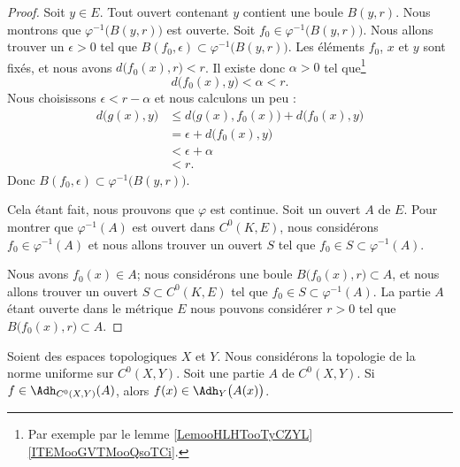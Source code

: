 \begin{proof}
	Soit \( y\in E\). Tout ouvert contenant \( y\) contient une boule \( B(y,r)\). Nous montrons que \( \varphi^{-1}\big( B(y,r) \big)\) est ouverte. Soit \( f_0\in\varphi^{-1}\big( B(y,r) \big)\). Nous allons trouver un \( \epsilon>0\) tel que \( B(f_0,\epsilon)\subset\varphi^{-1}\big( B(y,r) \big)\). Les éléments \( f_0\), \( x\) et \( y\) sont fixés, et nous avons \( d\big( f_0(x),r \big)<r\). Il existe donc \( \alpha>0\) tel que\footnote{Par exemple par le lemme \ref{LemooHLHTooTyCZYL}\ref{ITEMooGVTMooQsoTCi}.}
	\begin{equation}
		d\big( f_0(x),y \big)<\alpha<r.
	\end{equation}
	Nous choisissons \( \epsilon<r-\alpha\) et nous calculons un peu :
	\begin{subequations}
		\begin{align}
			d\big( g(x),y \big) & \leq d\big( g(x),f_0(x) \big)+d\big( f_0(x),y \big) \\
			                    & =\epsilon+d\big( f_0(x),y \big)                     \\
			                    & <\epsilon+\alpha                                    \\
			                    & <r.
		\end{align}
	\end{subequations}
	Donc \( B(f_0,\epsilon)\subset\varphi^{-1}\big( B(y,r) \big)\).

	Cela étant fait, nous prouvons que \( \varphi\) est continue. Soit un ouvert \( A\) de \( E\). Pour montrer que \( \varphi^{-1}(A)\) est ouvert dans \( C^0(K,E)\), nous considérons \( f_0\in\varphi^{-1}(A)\) et nous allons trouver un ouvert \( S\) tel que \( f_0\in S\subset\varphi^{-1}(A)\).

	Nous avons \( f_0(x)\in A\); nous considérons une boule \( B\big( f_0(x),r \big)\subset A\), et nous allons trouver un ouvert \( S\subset C^0(K,E)\) tel que \( f_0\in S\subset\varphi^{-1}(A)\). La partie \( A\) étant ouverte dans le métrique \( E\) nous pouvons considérer \( r>0\) tel que \( B\big( f_0(x),r \big)\subset A\).
\end{proof}

\begin{lemma}	\label{LEMooKWGOooKzqDud}
	Soient des espaces topologiques \( X\) et \( Y\). Nous considérons la topologie de la norme uniforme sur \( C^0(X,Y)\). Soit une partie \( A\) de \( C^0(X,Y)\). Si \( f\in \Adh_{C^0(X,Y)}(A)\), alors \( f(x)\in\Adh_Y\big( A(x) \big)\).
\end{lemma}

